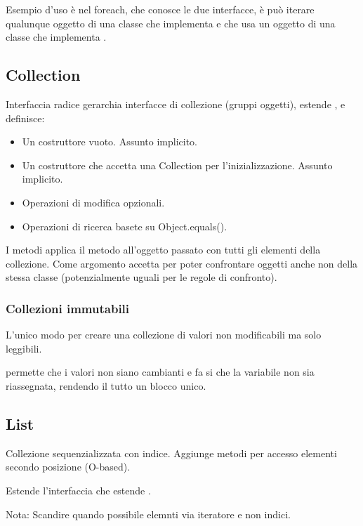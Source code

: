 Esempio d'uso è nel foreach, che conosce le due interfacce, è può iterare qualunque oggetto di una classe che implementa  e che usa un oggetto di una classe che implementa .

\subsection{Collection}
Interfaccia radice gerarchia interfacce di collezione (gruppi oggetti), estende , e definisce:
\begin{itemize}
	\item Un costruttore vuoto. Assunto implicito.
	\item Un costruttore che accetta una Collection per l'inizializzazione. Assunto implicito.
	\item Operazioni di modifica opzionali.
	\item Operazioni di ricerca basete su Object.equals().
\end{itemize}


I metodi  applica il metodo  all'oggetto passato con tutti gli elementi della collezione.
Come argomento accetta  per poter confrontare oggetti anche non della stessa classe (potenzialmente uguali per le regole di confronto).

\subsubsection{Collezioni immutabili}
L'unico modo per creare una collezione di valori non modificabili ma solo leggibili.



 permette che i valori non siano cambianti e  fa si che la variabile non sia riassegnata, rendendo il tutto un blocco unico.

\subsection{List}
Collezione sequenzializzata con indice. Aggiunge metodi per accesso elementi secondo posizione (O-based).

Estende l'interfaccia  che estende .

Nota: Scandire quando possibile elemnti via iteratore e non indici.


